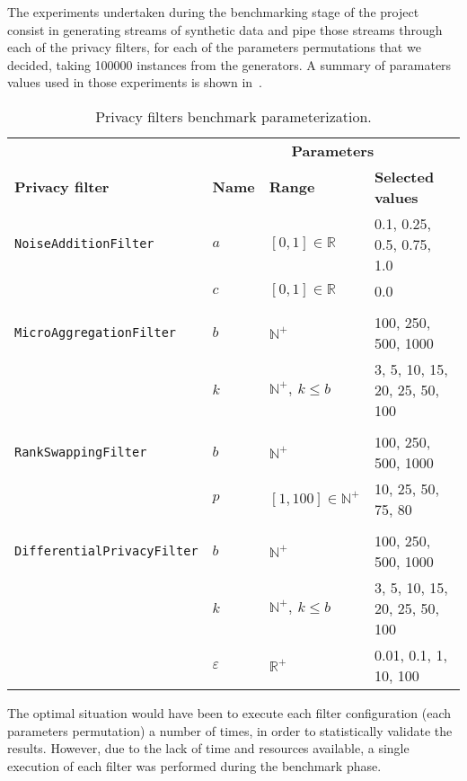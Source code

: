 The experiments undertaken during the benchmarking stage of the project consist in generating streams of synthetic data and pipe those streams through each of the privacy filters, for each of the parameters permutations that we decided, taking 100000 instances from the generators. A summary of paramaters values used in those experiments is shown in~.

\begin{table}[H]
	\centering
	\begin{tabular}{@{}llll@{}}
		\toprule
		& \multicolumn{3}{c}{\textbf{Parameters}} \\ \cmidrule{2-4}
		\textbf{Privacy filter} & \small\textbf{Name} & \small\textbf{Range} & \small\textbf{Selected values} \\ \midrule
		
		\footnotesize\texttt{NoiseAdditionFilter} & $a$ & $[0,1] \in \mathbb{R}$ & 0.1, 0.25, 0.5, 0.75, 1.0 \\
		& $c$ & $[0,1] \in \mathbb{R}$ & 0.0 \\
		&&&\\
		\footnotesize\texttt{MicroAggregationFilter} & $b$ & $\mathbb{N}^+$ & 100, 250, 500, 1000 \\
		& $k$ & $\mathbb{N}^+,~k \leq b$ & 3, 5, 10, 15, 20, 25, 50, 100 \\
		&&&\\
		\footnotesize\texttt{RankSwappingFilter} & $b$ & $\mathbb{N}^+$ & 100, 250, 500, 1000 \\
		& $p$ & $[1,100] \in \mathbb{N}^+$ & 10, 25, 50, 75, 80 \\
		&&&\\	
		\footnotesize\texttt{DifferentialPrivacyFilter} & $b$ & $\mathbb{N}^+$ & 100, 250, 500, 1000 \\
		& $k$ & $\mathbb{N}^+,~k \leq b$ & 3, 5, 10, 15, 20, 25, 50, 100 \\
		& $\varepsilon$ & $\mathbb{R}^+$ & 0.01, 0.1, 1, 10, 100 \\
		
		\bottomrule
	\end{tabular}
	\caption[Privacy filters benchmark parameterization.]{Privacy filters benchmark parameterization.}
	\label{table:filter-params-execution}
\end{table}

The optimal situation would have been to execute each filter configuration (each parameters permutation) a number of times, in order to statistically validate the results. However, due to the lack of time and resources available, a single execution of each filter was performed during the benchmark phase.


